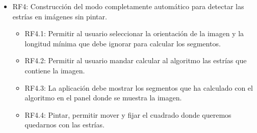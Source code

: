 \begin{itemize}
\item RF4: Construcción del modo completamente automático para detectar las estrías en imágenes sin pintar.
	\begin{itemize}
		\item RF4.1: Permitir al usuario seleccionar la orientación de la imagen y la longitud mínima que debe ignorar para calcular los segmentos. 
		\item RF4.2: Permitir al usuario mandar calcular al algoritmo las estrías que contiene la imagen.
		\item RF4.3: La aplicación debe mostrar los segmentos que ha calculado con el algoritmo en el panel donde se muestra la imagen.					
		\item RF4.4: Pintar, permitir mover y fijar el cuadrado donde queremos quedarnos con las estrías.
	\end{itemize}
\end{itemize}					
			 
